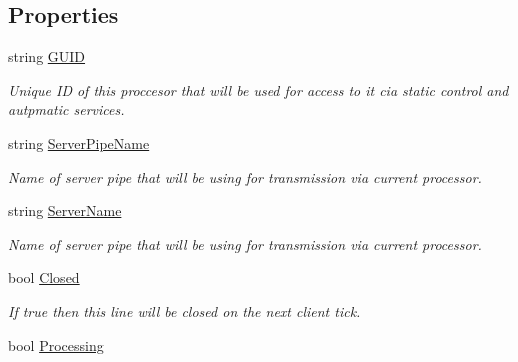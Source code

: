 \subsection*{Properties}
\begin{DoxyCompactItemize}
\item 
string \mbox{\hyperlink{class_pipes_provider_1_1_transmission_line_a9227989e298eefad921d81d3098d5148}{G\+U\+ID}}
\begin{DoxyCompactList}\small\item\em Unique ID of this proccesor that will be used for access to it cia static control and autpmatic services. \end{DoxyCompactList}\item 
string \mbox{\hyperlink{class_pipes_provider_1_1_transmission_line_a6acb67e0969ca43a54c9895ab1cdaae8}{Server\+Pipe\+Name}}
\begin{DoxyCompactList}\small\item\em Name of server pipe that will be using for transmission via current processor. \end{DoxyCompactList}\item 
string \mbox{\hyperlink{class_pipes_provider_1_1_transmission_line_a549bd893bb66b3f56e87209d3e776227}{Server\+Name}}
\begin{DoxyCompactList}\small\item\em Name of server pipe that will be using for transmission via current processor. \end{DoxyCompactList}\item 
bool \mbox{\hyperlink{class_pipes_provider_1_1_transmission_line_a4edc70c5ef641b2c600b69b65ff4ba00}{Closed}}
\begin{DoxyCompactList}\small\item\em If true then this line will be closed on the next client tick. \end{DoxyCompactList}\item 
bool \mbox{\hyperlink{class_pipes_provider_1_1_transmission_line_af5717e4ea0ba1bbca5685de995c1c88f}{Processing}}

\end{DoxyCompactItemize}
